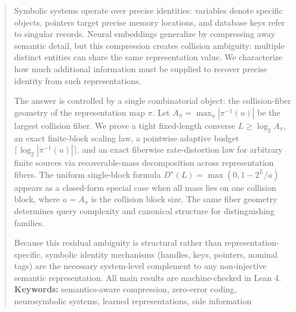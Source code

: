 \begin{abstract}
Symbolic systems operate over precise identities: variables denote specific objects, pointers target precise memory locations, and database keys refer to singular records. Neural embeddings generalize by compressing away semantic detail, but this compression creates collision ambiguity: multiple distinct entities can share the same representation value. We characterize how much additional information must be supplied to recover precise identity from such representations.

The answer is controlled by a single combinatorial object: the collision-fiber geometry of the representation map $\pi$. Let $A_{\pi}=\max_u |\pi^{-1}(u)|$ be the largest collision fiber. We prove a tight fixed-length converse $L \ge \log_2 A_{\pi}$, an exact finite-block scaling law, a pointwise adaptive budget $\lceil \log_2 |\pi^{-1}(u)|\rceil$, and an exact fiberwise rate-distortion law for arbitrary finite sources via recoverable-mass decomposition across representation fibers. The uniform single-block formula $D^\star(L)=\max(0,1-2^L/a)$ appears as a closed-form special case when all mass lies on one collision block, where $a = A_{\pi}$ is the collision block size. The same fiber geometry determines query complexity and canonical structure for distinguishing families.

Because this residual ambiguity is structural rather than representation-specific, symbolic identity mechanisms (handles, keys, pointers, nominal tags) are the necessary system-level complement to any non-injective semantic representation. All main results are machine-checked in Lean 4.
\textbf{Keywords:} semantics-aware compression, zero-error coding, neurosymbolic systems, learned representations, side information
\end{abstract}
